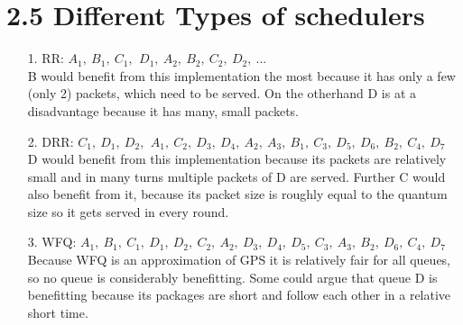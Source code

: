 \documentclass{article}
\begin{document}
	\section*{2.5 Different Types of schedulers}
	\begin{adjustwidth}{2em}{2em}
		\begin{enumerate}
			\item[1. RR:] $A_1, \ B_1, \ C_1, \,\ D_1, \ A_2, \ B_2, \ C_2, \ D_2, \ ...$ \\
			B would benefit from this implementation the most because it has only a few (only 2) packets, which need to be served. On the otherhand D is at a disadvantage because it has many, small packets.
			\item[2. DRR:] $C_1, \ D_1, \ D_2, \,\ A_1, \ C_2, \ D_3, \ D_4, \ A_2, \ A_3, \ B_1, \ C_3, \ D_5, \ D_6, \ B_2, \ C_4, \ D_7$ \\
			D would benefit from this implementation because its packets are relatively small and in many turns multiple packets of D are served. Further C would also benefit from it, because its packet size is roughly equal to the quantum size so it gets served in every round.
			\item[3. WFQ:] $A_1, \ B_1, \ C_1, \ D_1, \ D_2, \ C_2, \ A_2, \ D_3, \ D_4, \ D_5, \ C_3, \ A_3, \ B_2, \ D_6, \ C_4, \ D_7$ \\
			Because WFQ is an approximation of GPS it is relatively fair for all queues, so no queue is considerably benefitting. Some could argue that queue D is benefitting because its packages are short and follow each other in a relative short time.
		\end{enumerate}
	\end{adjustwidth}
\end{document}
